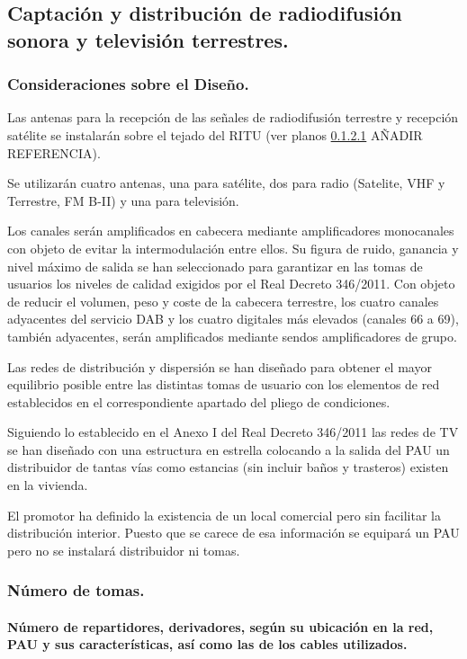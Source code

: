 \subsection{Captación y distribución de radiodifusión sonora y televisión terrestres.}

\subsubsection{Consideraciones sobre el Diseño.}


Las antenas para la recepción de las señales de radiodifusión terrestre y recepción satélite se instalarán sobre el tejado del RITU (ver planos \ref{} AÑADIR REFERENCIA).

Se utilizarán cuatro antenas, una para satélite, dos para radio (Satelite, VHF y Terrestre, FM B-II) y una para televisión.

Los canales serán amplificados en cabecera mediante amplificadores monocanales con objeto de evitar la intermodulación entre ellos. Su figura de ruido, ganancia y nivel máximo de salida se han seleccionado para garantizar en las tomas de usuarios los niveles de calidad exigidos por el Real Decreto 346/2011. Con objeto de reducir el volumen, peso y coste de la cabecera terrestre, los
cuatro canales adyacentes del servicio DAB y los cuatro digitales más elevados (canales 66 a 69), también adyacentes, serán amplificados mediante sendos amplificadores de grupo.

Las redes de distribución y dispersión se han diseñado para obtener el mayor equilibrio posible entre las distintas tomas de usuario con los elementos de red establecidos en el correspondiente apartado del pliego de condiciones.

Siguiendo lo establecido en el Anexo I del Real Decreto 346/2011 las redes de TV se han diseñado con una estructura en estrella colocando a la salida del PAU un distribuidor de tantas vías como estancias (sin incluir baños y trasteros) existen en la vivienda.

El promotor ha definido la existencia de un local comercial pero sin facilitar la distribución interior. Puesto que se carece de esa información se equipará un PAU pero no se instalará distribuidor ni tomas.

\subsubsection{Número de tomas.}
\paragraph{Número de repartidores, derivadores, según su ubicación en la red, PAU y sus características, así como las de los cables utilizados.}